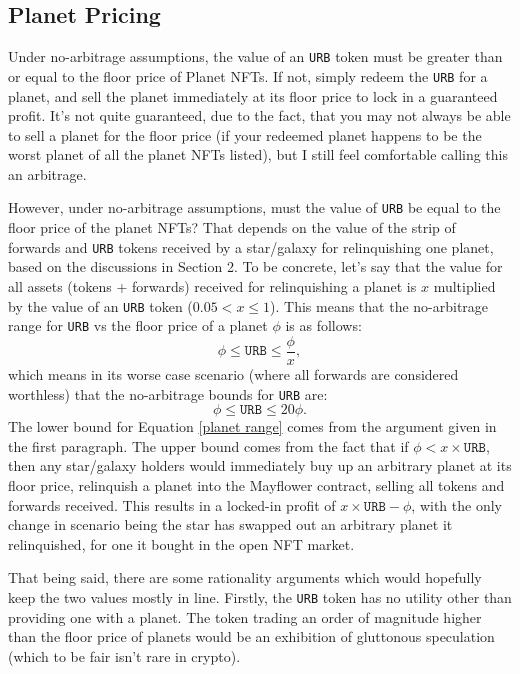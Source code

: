 \documentclass{article}
\begin{document}
	\subsection{Planet Pricing}
	Under no-arbitrage assumptions, the value of an \texttt{URB} token must be greater than or equal to the floor price of Planet NFTs. If not, simply redeem the \texttt{URB} for a planet, and sell the planet immediately at its floor price to lock in a guaranteed profit. It's not quite guaranteed, due to the fact, that you may not always be able to sell a planet for the floor price (if your redeemed planet happens to be the worst planet of all the planet NFTs listed), but I still feel comfortable calling this an arbitrage.
	
	However, under no-arbitrage assumptions, must the value of \texttt{URB} be equal to the floor price of the planet NFTs? That depends on the value of the strip of forwards and \texttt{URB} tokens received by a star/galaxy for relinquishing one planet, based on the discussions in Section 2. To be concrete, let's say that the value for all assets (tokens + forwards) received for relinquishing a planet is $x$ multiplied by the value of an \texttt{URB} token ($0.05 < x \leq 1$). This means that the no-arbitrage range for \texttt{URB} vs the floor price of a planet $\phi$ is as follows:
	\begin{equation}
		\label{planet range}
		\phi \leq \texttt{URB} \leq \frac{\phi}{x},
	\end{equation}
	which means in its worse case scenario (where all forwards are considered worthless) that the no-arbitrage bounds for \texttt{URB} are:
	\begin{equation}
		\phi \leq \texttt{URB} \leq 20\phi.
	\end{equation}
	The lower bound for Equation \ref{planet range} comes from the argument given in the first paragraph. The upper bound comes from the fact that if $ \phi < x\times\texttt{URB}$, then any star/galaxy holders would immediately buy up an arbitrary planet at its floor price, relinquish a planet into the Mayflower contract, selling all tokens and forwards received. This results in a locked-in profit of $x \times \texttt{URB} - \phi$, with the only change in scenario being the star has swapped out an arbitrary planet it relinquished, for one it bought in the open NFT market.
	
	That being said, there are some rationality arguments which would hopefully keep the two values mostly in line. Firstly, the \texttt{URB} token has no utility other than providing one with a planet. The token trading an order of magnitude higher than the floor price of planets would be an exhibition of gluttonous speculation (which to be fair isn't rare in crypto).
	
\end{document}
